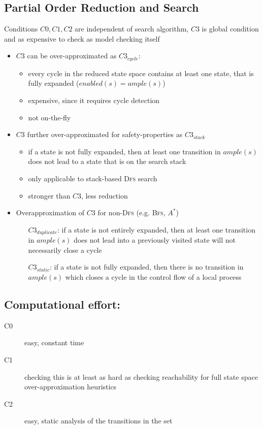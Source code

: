 \documentclass[a4paper, 10pt]{article}
\begin{document}
\subsection*{Partial Order Reduction and Search}
Conditions $C0,C1,C2$ are independent of search algorithm, $C3$ is global condition and as expensive to check as model checking itself
\begin{itemize}
    \item $C3$ can be over-approximated as $C3_{cycle}:$
    \begin{itemize}
        \item every cycle in the reduced state space contains at least one state, that is fully expanded ($enabled(s)=ample(s)$)
        \item expensive, since it requires cycle detection
        \item not on-the-fly
    \end{itemize}
    \item $C3$ further over-approximated for safety-properties as $C3_{stack}$
    \begin{itemize}
        \item if a state is not fully expanded, then at least one transition in $ample(s)$ does not lead to a state that is on the search stack
        \item only applicable to stack-based \textsc{Dfs} search
        \item stronger than $C3$, less reduction
    \end{itemize}
    \item Overapproximation of $C3$ for non-\textsc{Dfs} (e.g. \textsc{Bfs}, $A^*$)
    \begin{itemize}
        \item[$C3_{duplicate}$:] if a state is not entirely expanded, then at least one transition in $ample(s)$ does not lead into a previously visited state \follows will not necessarily close a cycle
        \item[$C3_{static}$:] if a state is not fully expanded, then there is no transition in $ample(s)$ which closes a cycle in the control flow of a local process
    \end{itemize}
    \begin{center}
    \scalebox{1}{}
    \end{center}
\end{itemize}
\subsection*{Computational effort:}
\begin{description}
    \item[C0] easy, constant time
    \item[C1] checking this is at least as hard as checking reachability for full state space \follows over-approximation heuristics
    \item[C2] easy, static analysis of the transitions in the set
\end{description}
\end{document}
